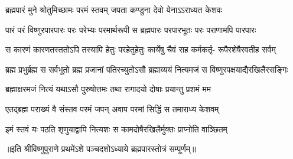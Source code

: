 

\addtocounter{shlokacount}{53}

\twolineshloka
{ब्रह्मपारं मुने श्रोतुमिच्छामः परमं स्तवम्}
{जपता कण्डुना देवो येनाऽऽराध्यत केशवः} %

\fourlineindentedshloka
{पारं परं विष्णुरपारपारः}
{परः परेभ्यः परमार्थरूपी}
{स ब्रह्मपारः परपारभूतः}
{परः पराणामपि पारपारः} %

\fourlineindentedshloka
{स कारणं कारणतस्ततोऽपि}
{तस्यापि हेतुः परहेतुहेतुः}
{कार्येषु चैवं सह कर्मकर्तृ-}
{रूपैरशेषैरवतीह सर्वम्} %

\fourlineindentedshloka
{ब्रह्म प्रभुर्ब्रह्म स सर्वभूतो}
{ब्रह्म प्रजानां पतिरच्युतोऽसौ} 
{ब्रह्माव्ययं नित्यमजं स}
{विष्णुरपक्षयाद्यैरखिलैरसङ्गिः} %

\twolineshloka
{ब्रह्माक्षरमजं नित्यं यथाऽसौ पुरुषोत्तमः}
{तथा रागादयो दोषाः प्रयान्तु प्रशमं मम} %


\twolineshloka
{एतद्ब्रह्म पराख्यं वै संस्तव परमं जपन्}
{अवाप परमां सिद्धिं स तमाराध्य केशवम्} %

\twolineshloka
{इमं स्तवं यः पठति शृणुयाद्वापि नित्यशः}
{स कामदोषैरखिलैर्मुक्तः प्राप्नोति वाञ्छितम्} %

॥इति श्रीविष्णुपुराणे प्रथमेंऽशे पञ्चदशोऽध्याये ब्रह्मपारस्तोत्रं सम्पूर्णम्॥ 